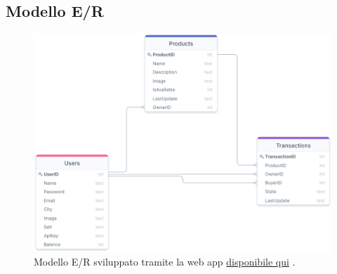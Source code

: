 \subsection{Modello E/R}
\begin{figure} [ht]
    \centering\includegraphics[scale=0.29]{images/modello_e_r.png}
    \caption{Modello E/R sviluppato tramite la web app \href{https://drawsql.app}{disponibile qui} \cite{DrawSQL}.}
\end{figure}
